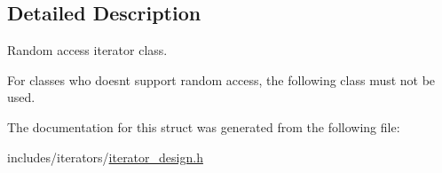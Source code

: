 \subsection{Detailed Description}
Random access iterator class. 

For classes who doesn\textquotesingle{}t support random access, the following class must not be used. 

The documentation for this struct was generated from the following file\+:\begin{DoxyCompactItemize}
\item 
includes/iterators/\hyperlink{iterator__design_8h}{iterator\+\_\+design.\+h}\end{DoxyCompactItemize}
